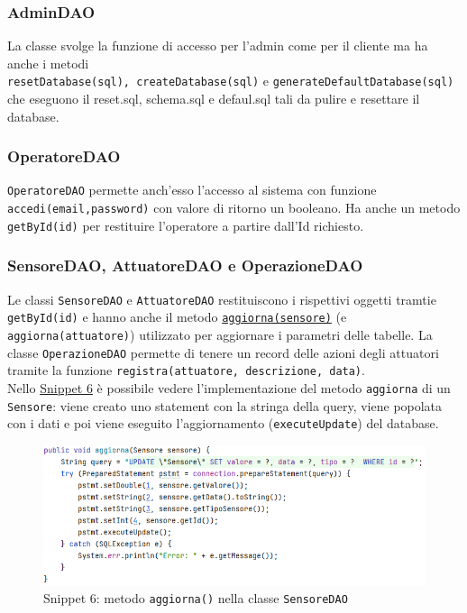 \documentclass{article}
\newcommand{\code}[1]{\texttt{#1}}
\begin{document}
\subsubsection{AdminDAO}
La classe svolge la funzione di accesso per l'admin come per il cliente ma ha anche i metodi   \\ \code{resetDatabase(sql), createDatabase(sql)} e \code{generateDefaultDatabase(sql)} che eseguono il reset.sql, schema.sql e defaul.sql tali da pulire e resettare il database.

\subsubsection{OperatoreDAO}
\code{OperatoreDAO} permette anch'esso l'accesso al sistema con funzione \code{accedi(email,password)} con valore di ritorno un booleano. Ha anche un metodo \code{getById(id)} per restituire l'operatore a partire dall'Id richiesto.

\subsubsection{SensoreDAO, AttuatoreDAO e OperazioneDAO}
Le classi \code{SensoreDAO} e \code{AttuatoreDAO} restituiscono i rispettivi oggetti tramtie \code{getById(id)} e hanno anche il metodo \hyperref[fig:snippet_sensoreDAOaggiorna]{\code{aggiorna(sensore)}} (e \code{aggiorna(attuatore)}) utilizzato per aggiornare i parametri delle tabelle. La classe \code{OperazioneDAO} permette di tenere un record delle azioni degli attuatori tramite la funzione \code{registra(attuatore, descrizione, data)}. \\
Nello \hyperref[fig:snippet_sensoreDAOaggiorna]{Snippet 6} è possibile vedere l'implementazione del metodo \code{aggiorna} di un \code{Sensore}: viene creato uno statement con la stringa della query, viene popolata con i dati e poi viene eseguito l'aggiornamento (\code{executeUpdate}) del database.

\begin{figure}[H]
    \centering
    \includegraphics[scale=0.5]{resources/images/Snippets/snippet_sensoreDAOaggiorna.png}
    \captionsetup{labelformat=empty,labelsep=none}
    \caption{Snippet 6: metodo \code{aggiorna()} nella classe \code{SensoreDAO}}
    \label{fig:snippet_sensoreDAOaggiorna}
\end{figure}
\end{document}
